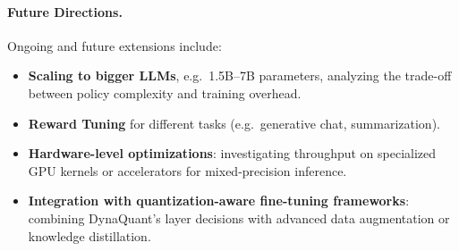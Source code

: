 \documentclass{article}
\begin{document}
	\paragraph{Future Directions.}
	Ongoing and future extensions include:
	\begin{itemize}
		\item \textbf{Scaling to bigger LLMs}, e.g.\ 1.5B–7B parameters, analyzing the trade-off between policy complexity and training overhead.
		\item \textbf{Reward Tuning} for different tasks (e.g.\ generative chat, summarization).
		\item \textbf{Hardware-level optimizations}: investigating throughput on specialized GPU kernels or accelerators for mixed-precision inference.
		\item \textbf{Integration with quantization-aware fine-tuning frameworks}: combining DynaQuant’s layer decisions with advanced data augmentation or knowledge distillation.
	\end{itemize}
	
	\balance
	
	
	
\end{document}
